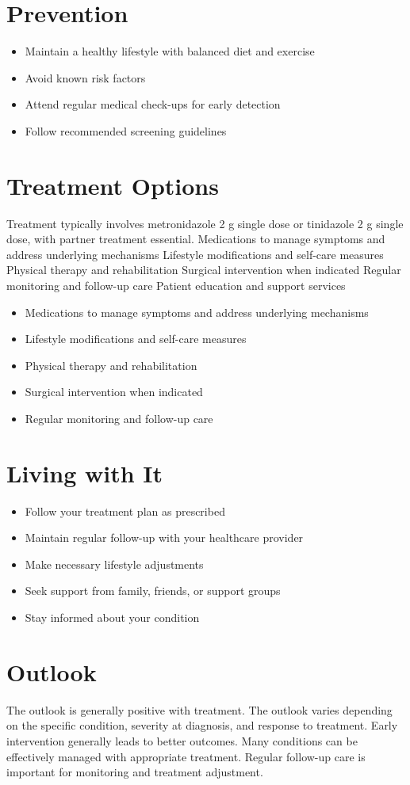 \section{Prevention}
\begin{itemize}[noitemsep]
  \item Maintain a healthy lifestyle with balanced diet and exercise
  \item Avoid known risk factors
  \item Attend regular medical check-ups for early detection
  \item Follow recommended screening guidelines
\end{itemize}
\section{Treatment Options}
Treatment typically involves metronidazole 2 g single dose or tinidazole 2 g single dose, with partner treatment essential. Medications to manage symptoms and address underlying mechanisms Lifestyle modifications and self-care measures Physical therapy and rehabilitation Surgical intervention when indicated Regular monitoring and follow-up care Patient education and support services

\begin{itemize}[noitemsep]
  \item Medications to manage symptoms and address underlying mechanisms
  \item Lifestyle modifications and self-care measures
  \item Physical therapy and rehabilitation
  \item Surgical intervention when indicated
  \item Regular monitoring and follow-up care
\end{itemize}
\section{Living with It}
\begin{itemize}[noitemsep]
  \item Follow your treatment plan as prescribed
  \item Maintain regular follow-up with your healthcare provider
  \item Make necessary lifestyle adjustments
  \item Seek support from family, friends, or support groups
  \item Stay informed about your condition
\end{itemize}
\section{Outlook}
The outlook is generally positive with treatment. The outlook varies depending on the specific condition, severity at diagnosis, and response to treatment. Early intervention generally leads to better outcomes. Many conditions can be effectively managed with appropriate treatment. Regular follow-up care is important for monitoring and treatment adjustment.

